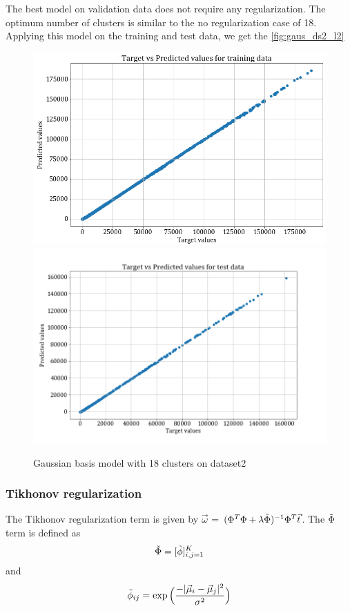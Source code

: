 \documentclass[12pt,a4paper]{article}
\newcommand{\noi}{\noindent}
\begin{document}
\noi
The best model on validation data does not require any regularization. The optimum number of clusters is similar to the no regularization case of 18. Applying this model on the training and test data, we get the \autoref{fig:gaus_ds2_l2}
\begin{figure}
    \centering
    \includegraphics[scale=0.25]{images/train_ds2_L2reg.png}
    \includegraphics[scale=0.25]{images/test_ds2_L2reg.png}
    \caption{Gaussian basis model with 18 clusters on dataset2}
    \label{fig:gaus_ds2_l2}
\end{figure}
\subsubsection{Tikhonov regularization}
The Tikhonov regularization term is given by $\vec{\omega}$ = $(\Phi^T\Phi + \lambda \Tilde{\Phi})^{-1} \Phi^T \vec{t}$. The $\Tilde{\Phi}$ term is defined as 
\begin{equation}
    \Tilde{\Phi} = [\Tilde{\phi}]_{i,j = 1}^{K}
\end{equation}
and 
\begin{equation}
    \Tilde{\phi}_{ij} =  \exp\Big(\frac{-|\vec{\mu}_i - \vec{\mu}_j|^2}{\sigma^2}\Big)
\end{equation}
\end{document}

